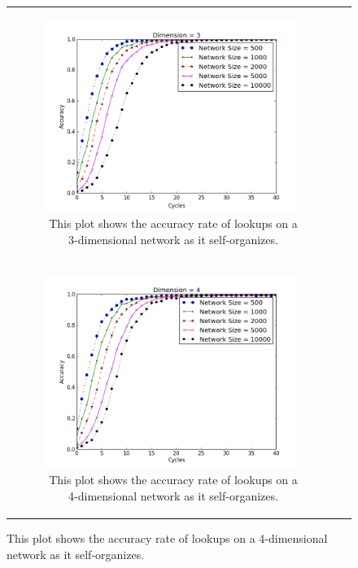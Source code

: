 \begin{figure}
\begin{tabular}{cc}
		\begin{subfigure}{0.5\columnwidth}
			\includegraphics[width=\linewidth]{figs/conv_d3}
			\caption{This plot shows the accuracy rate of lookups on a 3-dimensional network as it self-organizes.}
			\label{fig:conv3}
		\end{subfigure} \\

		\begin{subfigure}{0.5\columnwidth}
			\includegraphics[width=\linewidth]{figs/conv_d4}
			\caption{This plot shows the accuracy rate of lookups on a 4-dimensional network as it self-organizes.}
			\label{fig:conv4}
		\end{subfigure} &



\end{tabular}
\end{figure}
